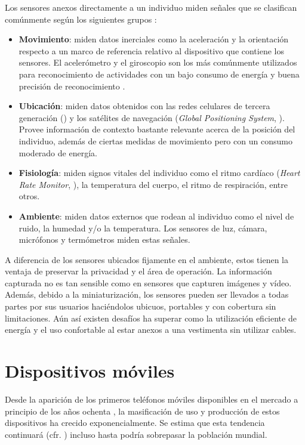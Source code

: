 Los sensores anexos directamente a un individuo miden señales que
se clasifican comúnmente según los siguientes grupos \cite{LaraLabrador2013}:
\begin{itemize}
\item \textbf{Movimiento}: miden datos inerciales como la aceleración y
la orientación respecto a un marco de referencia relativo al dispositivo
que contiene los sensores. El acelerómetro y el giroscopio son los
más comúnmente utilizados para reconocimiento de actividades con un
bajo consumo de energía y buena precisión de reconocimiento \cite{Bao2004,LaraLabrador2012}.
\item \textbf{Ubicación}: miden datos obtenidos con las redes celulares
de tercera generación () y los satélites de navegación (\emph{Global
Positioning System}, ). Provee información de contexto
bastante relevante acerca de la posición del individuo, además de
ciertas medidas de movimiento pero con un consumo moderado de energía.
\item \textbf{Fisiología}: miden signos vitales del individuo como el ritmo
cardíaco (\emph{Heart Rate Monitor},\emph{ }), la temperatura
del cuerpo, el ritmo de respiración, entre otros.
\item \textbf{Ambiente}: miden datos externos que rodean al individuo como
el nivel de ruido, la humedad y/o la temperatura. Los sensores de
luz, cámara, micrófonos y termómetros miden estas señales. 
\end{itemize}
A diferencia de los sensores ubicados fijamente en el ambiente, estos
tienen la ventaja de preservar la privacidad y el área de operación.
La información capturada no es tan sensible como en sensores que capturen
imágenes y vídeo. Además, debido a la miniaturización, los sensores
pueden ser llevados a todas partes por sus usuarios haciéndolos ubicuos,
portables y con cobertura sin limitaciones. Aún así existen desafíos
ha superar como la utilización eficiente de energía y el uso confortable
al estar anexos a una vestimenta sin utilizar cables.

\section{Dispositivos móviles}

\label{sec24:dispositivos-moviles} Desde la aparición de los primeros
teléfonos móviles disponibles en el mercado a principio de los años
ochenta \cite{Tanenbaum2010}, la masificación de uso y producción
de estos dispositivos ha crecido exponencialmente. Se estima que esta
tendencia continuará (cfr. \cite{Ekholm2011}) incluso hasta podría
sobrepasar la población mundial.

